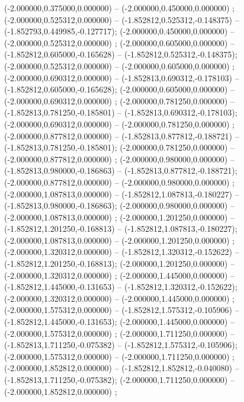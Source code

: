  (-2.000000,0.375000,0.000000) -- (-2.000000,0.450000,0.000000) ;
 (-2.000000,0.525312,0.000000) -- (-1.852812,0.525312,-0.148375) -- (-1.852793,0.449985,-0.127717);
 (-2.000000,0.450000,0.000000) -- (-2.000000,0.525312,0.000000) ;
 (-2.000000,0.605000,0.000000) -- (-1.852812,0.605000,-0.165628) -- (-1.852812,0.525312,-0.148375);
 (-2.000000,0.525312,0.000000) -- (-2.000000,0.605000,0.000000) ;
 (-2.000000,0.690312,0.000000) -- (-1.852813,0.690312,-0.178103) -- (-1.852812,0.605000,-0.165628);
 (-2.000000,0.605000,0.000000) -- (-2.000000,0.690312,0.000000) ;
 (-2.000000,0.781250,0.000000) -- (-1.852813,0.781250,-0.185801) -- (-1.852813,0.690312,-0.178103);
 (-2.000000,0.690312,0.000000) -- (-2.000000,0.781250,0.000000) ;
 (-2.000000,0.877812,0.000000) -- (-1.852813,0.877812,-0.188721) -- (-1.852813,0.781250,-0.185801);
 (-2.000000,0.781250,0.000000) -- (-2.000000,0.877812,0.000000) ;
 (-2.000000,0.980000,0.000000) -- (-1.852813,0.980000,-0.186863) -- (-1.852813,0.877812,-0.188721);
 (-2.000000,0.877812,0.000000) -- (-2.000000,0.980000,0.000000) ;
 (-2.000000,1.087813,0.000000) -- (-1.852812,1.087813,-0.180227) -- (-1.852813,0.980000,-0.186863);
 (-2.000000,0.980000,0.000000) -- (-2.000000,1.087813,0.000000) ;
 (-2.000000,1.201250,0.000000) -- (-1.852812,1.201250,-0.168813) -- (-1.852812,1.087813,-0.180227);
 (-2.000000,1.087813,0.000000) -- (-2.000000,1.201250,0.000000) ;
 (-2.000000,1.320312,0.000000) -- (-1.852812,1.320312,-0.152622) -- (-1.852812,1.201250,-0.168813);
 (-2.000000,1.201250,0.000000) -- (-2.000000,1.320312,0.000000) ;
 (-2.000000,1.445000,0.000000) -- (-1.852812,1.445000,-0.131653) -- (-1.852812,1.320312,-0.152622);
 (-2.000000,1.320312,0.000000) -- (-2.000000,1.445000,0.000000) ;
 (-2.000000,1.575312,0.000000) -- (-1.852812,1.575312,-0.105906) -- (-1.852812,1.445000,-0.131653);
 (-2.000000,1.445000,0.000000) -- (-2.000000,1.575312,0.000000) ;
 (-2.000000,1.711250,0.000000) -- (-1.852813,1.711250,-0.075382) -- (-1.852812,1.575312,-0.105906);
 (-2.000000,1.575312,0.000000) -- (-2.000000,1.711250,0.000000) ;
 (-2.000000,1.852812,0.000000) -- (-1.852812,1.852812,-0.040080) -- (-1.852813,1.711250,-0.075382);
 (-2.000000,1.711250,0.000000) -- (-2.000000,1.852812,0.000000) ;
